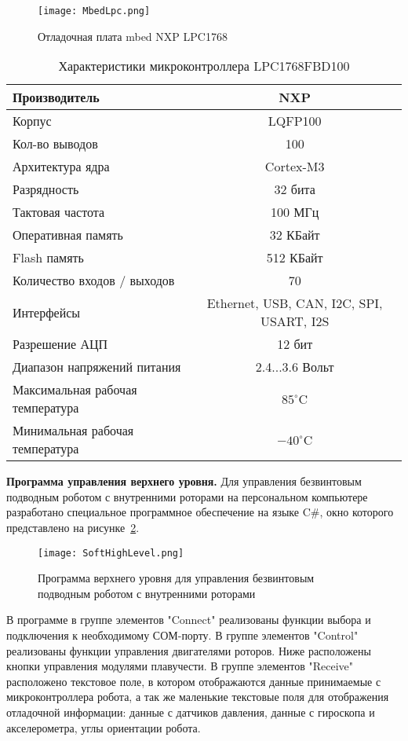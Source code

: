 \begin{figure}[h]
	\centering
	\texttt{[image: MbedLpc.png]}%
	\caption{Отладочная плата mbed NXP LPC1768}
	\label{MbedLpc}
\end{figure}

\begin{table}[h]
	\centering
	\caption{Характеристики микроконтроллера LPC1768FBD100}\label{tabLpc}
	\begin{tabular}{|l|c|}
		\hline
		Производитель &	NXP \\ \hline
		Корпус 	& LQFP100 \\ \hline
		Кол-во выводов 	& 100\\ \hline
		Архитектура ядра & Cortex-M3	\\ \hline
		Разрядность	& 32 бита\\ \hline
		Тактовая частота	& 100 МГц 	\\ \hline
		Оперативная память 	& 32 КБайт\\ \hline		
		Flash память & 512 КБайт\\ \hline		
		Количество входов / выходов & 70	\\ \hline
		Интерфейсы 	& Ethernet, USB, CAN, I2C, SPI, USART, I2S\\ \hline
		Разрешение АЦП & 12 бит\\ \hline
		Диапазон напряжений питания 	& 2.4...3.6 Вольт\\ \hline	
		Максимальная рабочая температура	&	$85^\circ$C 	\\ \hline
		Минимальная рабочая температура 	&	$-40^\circ$C \\ \hline	
	\end{tabular}
\end{table}

\textbf{Программа управления верхнего уровня.} Для управления безвинтовым подводным роботом с внутренними роторами на персональном компьютере разработано специальное программное обеспечение на языке C\#, окно которого представлено на рисунке~\ref{SoftHighLevel}. 

\begin{figure}[h]
	\centering
	\texttt{[image: SoftHighLevel.png]}%
	\caption{Программа верхнего уровня для управления безвинтовым подводным роботом с внутренними роторами}
	\label{SoftHighLevel}
\end{figure}

В программе в группе элементов "Connect" реализованы функции выбора и подключения к необходимому СОМ-порту. В группе элементов "Control" реализованы функции управления двигателями роторов. Ниже расположены кнопки управления модулями плавучести. В группе элементов "Receive" расположено текстовое поле, в котором отображаются данные принимаемые с микроконтроллера робота, а так же маленькие текстовые поля для отображения отладочной информации: данные с датчиков давления, данные с гироскопа и акселерометра, углы ориентации робота.



